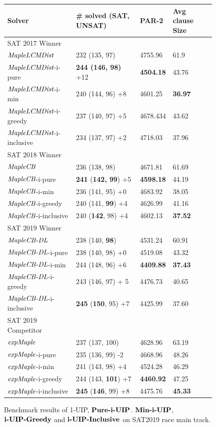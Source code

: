 \begin{figure} 
\begin{center}
\begin{tabular}{ | m{3.7cm} | m{4cm}| m{2cm} | m{2.75cm} |  } 
\hline
Solver & \# solved (SAT, UNSAT) & PAR-2 & Avg clause Size \\ 
\hline
SAT 2017 Winner & & & \\
$\textit{MapleLCMDist}$ & 232 (135, 97) & 4755.96 & 61.9  \\ 
\hline
$\textit{MapleLCMDist}$-i-pure & \textbf{244 (146, 98)} +12 & \textbf{4504.18} & 43.76 \\
\hline
$\textit{MapleLCMDist}$-i-min & 240 (144, 96) +8 & 4601.25 & \textbf{36.97} \\ 
\hline
$\textit{MapleLCMDist}$-i-greedy & 237 (140, 97) +5 & 4678.434 & 43.62 \\ 
\hline
$\textit{MapleLCMDist}$-i-inclusive & 234 (137, 97) +2 & 4718.03 & 37.96 \\
\hline
\hline
SAT 2018 Winner & & & \\
$\textit{MapleCB}$ & 236 (138, 98) & 4671.81 & 61.69 \\
\hline
$\textit{MapleCB}$-i-pure & \textbf{241} (\textbf{142, 99}) +5 & \textbf{4598.18} & 44.19 \\
\hline
$\textit{MapleCB}$-i-min & 236 (141, 95) +0 & 4683.92 & 38.05 \\ 
\hline
$\textit{MapleCB}$-i-greedy & 240 (141, \textbf{99}) +4 & 4626.99 & 41.16 \\
\hline
$\textit{MapleCB}$-i-inclusive & 240 (\textbf{142}, 98) +4 & 4602.13 & \textbf{37.52} \\
\hline
\hline
SAT 2019 Winner & & & \\
$\textit{MapleCB-DL}$ & 238 (140, \textbf{98}) & 4531.24 & 60.91 \\
\hline
$\textit{MapleCB-DL}$-i-pure & 238 (140, 98) +0 & 4519.08 &  43.32\\
\hline
$\textit{MapleCB-DL}$-i-min & 244 (148, 96) +6 & \textbf{4409.88} & \textbf{37.43} \\
\hline
$\textit{MapleCB-DL}$-i-greedy & 243 (146, 97) + 5 & 4476.73 & 40.65 \\
\hline
$\textit{MapleCB-DL}$-i-inclusive & \textbf{245} (\textbf{150}, 95) +7 & 4425.99 & 37.60 \\
\hline
\hline
SAT 2019 Competitor & & &\\
$\textit{expMaple}$ & 237 (137, 100)  & 4628.96 & 63.19 \\
\hline
$\textit{expMaple}$-i-pure & 235 (136, 99) -2  & 4668.96 & 48.26 \\
\hline
$\textit{expMaple}$-i-min & 241 (143, 98) +4 & 4524.28 & 46.29 \\ 
\hline
$\textit{expMaple}$-i-greedy & 244 (143, \textbf{101}) +7 & \textbf{4460.92} & 47.25 \\
\hline
$\textit{expMaple}$-i-inclusive & \textbf{245} (\textbf{146}, 99) +8 & 4475.76 & \textbf{45.33} \\
\hline
\end{tabular}
\end{center}
\caption{Benchmark results of 1-UIP, $\textbf{Pure-i-UIP}$. $\textbf{Min-i-UIP}$, $\textbf{i-UIP-Greedy}$ and $\textbf{i-UIP-Inclusive}$ on SAT2019 race main track.}
\label{fig:t5}
\end{figure}

